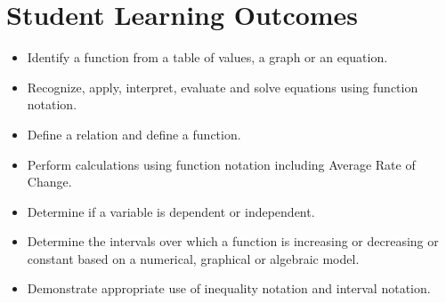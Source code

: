 \documentclass[10pt,]{book}
\theoremstyle{plain}
\theoremstyle{definition}
\begin{document}
\section[Student Learning Outcomes]{Student Learning Outcomes}\label{learning-outcomes-functions}
\leavevmode%
\begin{itemize}[label=\textbullet]
\item{}Identify a function from a table of values, a graph or an equation.%
\item{}Recognize, apply, interpret, evaluate and solve equations using function notation.%
\item{}Define a relation and define a function.%
\item{}Perform calculations using function notation including Average Rate of Change.%
\item{}Determine if a variable is dependent or independent.%
\item{}Determine the intervals over which a function is increasing or decreasing or constant based on a numerical, graphical or algebraic model.%
\item{}Demonstrate appropriate use of inequality notation and interval notation.%
\end{itemize}
\typeout{************************************************}
\typeout{************************************************}
\end{document}
